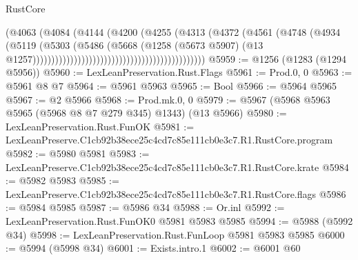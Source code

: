 \begin{lexlean}{RustCore}
\begin{coremodule}
                                                                (@4063
                                                                  (@4084
                                                                    (@4144
                                                                      (@4200
                                                                        (@4255
                                                                          (@4313
                                                                            (@4372
                                                                              (@4561
                                                                                (@4748
                                                                                  (@4934
                                                                                    (@5119
                                                                                      (@5303
                                                                                        (@5486
                                                                                          (@5668
                                                                                            (@1258
                                                                                              (@5673
                                                                                                @5907)
                                                                                              (@13
                                                                                                @1257))))))))))))))))))))))))))))))))))))))))))))))
@5959 := @1256 (@1283 (@1294 @5956))
@5960 := LexLeanPreservation.Rust.Flags
@5961 := Prod.{0, 0}
@5963 := @5961 @8 @7
@5964 := @5961 @5963
@5965 := Bool
@5966 := @5964 @5965
@5967 := @2 @5966
@5968 := Prod.mk.{0, 0}
@5979 := @5967 (@5968 @5963 @5965 (@5968 @8 @7 @279 @345) @1343) (@13 @5966)
@5980 := LexLeanPreservation.Rust.FunOK
@5981 := LexLeanPreserve.C1cb92b38ece25c4cd7c85e111cb0e3c7.R1.RustCore.program
@5982 := @5980 @5981
@5983 := LexLeanPreserve.C1cb92b38ece25c4cd7c85e111cb0e3c7.R1.RustCore.krate
@5984 := @5982 @5983
@5985 := LexLeanPreserve.C1cb92b38ece25c4cd7c85e111cb0e3c7.R1.RustCore.flags
@5986 := @5984 @5985
@5987 := @5986 @34
@5988 := Or.inl
@5992 := LexLeanPreservation.Rust.FunOK0 @5981 @5983 @5985
@5994 := @5988 (@5992 @34)
@5998 := LexLeanPreservation.Rust.FunLoop @5981 @5983 @5985
@6000 := @5994 (@5998 @34)
@6001 := Exists.intro.{1}
@6002 := @6001 @60

\end{coremodule}
\end{lexlean}

